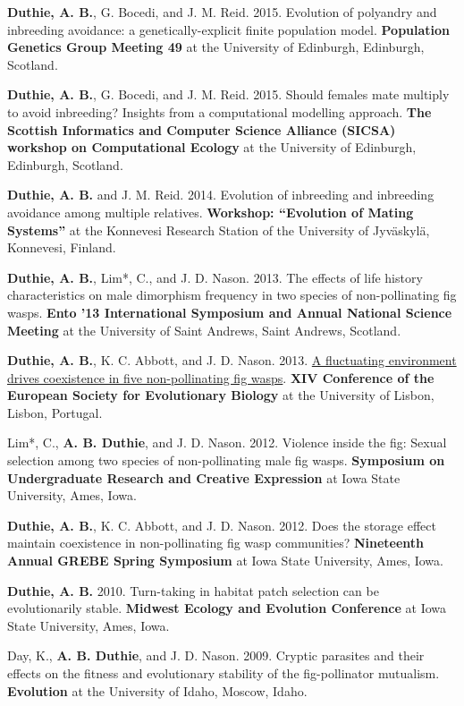 \documentclass[letterpaper]{article}
\renewenvironment{itemize}{
  \begin{list}{}{
    \setlength{\leftmargin}{1.5em}
  }
}{
  \end{list}
}
\begin{document}
\begin{itemize}
\item {\bf Duthie, A. B.}, G. Bocedi, and J. M. Reid. 2015. Evolution of polyandry and inbreeding avoidance: a genetically-explicit finite population model. {\bf Population Genetics Group Meeting 49} at the University of Edinburgh, Edinburgh, Scotland.
\item {\bf Duthie, A. B.}, G. Bocedi, and J. M. Reid. 2015. Should females mate multiply to avoid inbreeding? Insights from a computational modelling approach. {\bf The Scottish Informatics and Computer Science Alliance (SICSA) workshop on Computational Ecology} at the University of Edinburgh, Edinburgh, Scotland.
\item {\bf Duthie, A. B.} and J. M. Reid. 2014. Evolution of inbreeding and inbreeding avoidance among multiple relatives. {\bf Workshop: ``Evolution of Mating Systems''} at the Konnevesi Research Station of the University of Jyv\"{a}skyl\"{a}, Konnevesi, Finland.
\item {\bf Duthie, A. B.}, Lim*, C., and J. D. Nason. 2013. The effects of life history characteristics on male dimorphism frequency in two species of non-pollinating fig wasps. {\bf Ento '13 International Symposium and Annual National Science Meeting} at the University of Saint Andrews, Saint Andrews, Scotland.
\item {\bf Duthie, A. B.}, K. C. Abbott, and J. D. Nason. 2013. \href{https://www.youtube.com/watch?v=8Oi48FdaLXY}{A fluctuating environment drives coexistence in five non-pollinating fig wasps}. {\bf XIV Conference of the European Society for Evolutionary Biology} at the University of Lisbon, Lisbon, Portugal.
\item Lim*, C., {\bf A. B. Duthie}, and J. D. Nason. 2012. Violence inside the fig: Sexual selection among two species of non-pollinating male fig wasps. {\bf Symposium on Undergraduate Research and Creative Expression} at Iowa State University, Ames, Iowa.
\item {\bf Duthie, A. B.}, K. C. Abbott, and J. D. Nason. 2012. Does the storage effect maintain coexistence in non-pollinating fig wasp communities? {\bf Nineteenth Annual GREBE Spring Symposium} at Iowa State University, Ames, Iowa.
\item {\bf Duthie, A. B.} 2010. Turn-taking in habitat patch selection can be evolutionarily stable. {\bf Midwest Ecology and Evolution Conference} at Iowa State University, Ames, Iowa.
\item Day, K., {\bf A. B. Duthie}, and J. D. Nason. 2009. Cryptic parasites and their effects on the fitness and evolutionary stability of the fig-pollinator mutualism. {\bf Evolution} at the University of Idaho, Moscow, Idaho.

\end{itemize}
\end{document}
